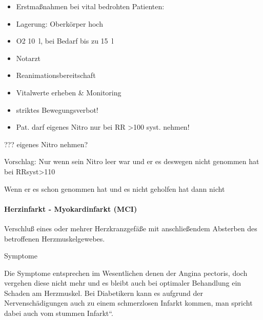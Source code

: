 \documentclass{article}
\begin{document}
\begin{itemize}
\item Erstma{\ss}nahmen bei vital bedrohten Patienten: 

\end{itemize}
\begin{itemize}
\item Lagerung: Oberk\"orper hoch

\item O2 10~l, bei Bedarf bis zu 15~l

\item Notarzt

\item Reanimationsbereitschaft

\end{itemize}
\begin{itemize}
\item Vitalwerte erheben \& Monitoring 

\item striktes Bewegungsverbot!

\item %
%
Pat. darf eigenes Nitro nur  bei RR {\textgreater}100 syst. nehmen!

\end{itemize}
??? eigenes Nitro nehmen?

Vorschlag: Nur wenn sein Nitro leer war und er es deswegen nicht
genommen hat bei RRsyst{\textgreater}110

Wenn er es schon genommen hat und es nicht geholfen hat dann nicht

\paragraph{Herzinfarkt - Myokardinfarkt (MCI)}
Verschlu{\ss} eines oder mehrer Herzkranzgef\"a{\ss}e mit
anschlie{\ss}endem Absterben des betroffenen Herzmuskelgewebes. 

Symptome

Die Symptome entsprechen im Wesentlichen denen der Angina pectoris, doch
vergehen diese nicht mehr und es bleibt auch bei optimaler Behandlung
ein Schaden am Herzmuskel. Bei Diabetikern kann es aufgrund der
Nervensch\"adigungen auch zu einem schmerzlosen Infarkt kommen, man
spricht dabei auch vom {\quotedblbase}stummen
Infarkt{\textquotedblleft}.
\end{document}
